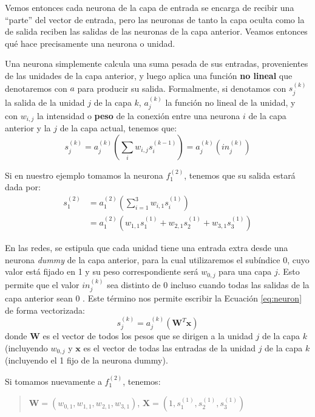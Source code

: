 \documentclass[../../main.tex]{subfiles}
\begin{document}
Vemos entonces cada neurona de la capa de entrada se encarga de recibir una ``parte'' del
vector de entrada, pero las neuronas de tanto la capa oculta como la de salida reciben las
salidas de las neuronas de la capa anterior. Veamos entonces qué hace precisamente una
neurona o unidad.

Una neurona simplemente calcula una suma pesada de sus entradas, provenientes de las
unidades de la capa anterior, y luego aplica una función \textbf{no lineal} que
denotaremos con \(a\) para producir su salida. Formalmente, si denotamos con \(s^{(k)}_j\)
la salida de la unidad \(j\) de la capa \(k\), \(a^{(k)}_j\) la función no lineal de la
unidad, y con \(w_{i,j}\) la intensidad o \textbf{peso} de la conexión entre una neurona
\(i\) de la capa anterior y la \(j\) de la capa actual, tenemos que:
\begin{equation}
    s^{(k)}_j = a^{(k)}_j \left( \sum_i w_{i,j} s^{(k-1)}_i \right) = a^{(k)}_j (in^{(k)}_j)
    \label{eq:neuron}
\end{equation}

Si en nuestro ejemplo tomamos la neurona \(f^{(2)}_1\), tenemos que su salida estará dada
por:
\begin{align*}
    s^{(2)}_1 &= a^{(2)}_1 \left( \sum_{i=1}^{3} w_{i,1} s^{(1)}_i \right) \\
              &= a^{(2)}_1 \left( w_{1,1}s^{(1)}_1 +  w_{2,1}s^{(1)}_2 + w_{3,1}s^{(1)}_3 \right)
\end{align*}

En las redes, se estipula que cada unidad tiene una entrada extra desde una neurona
\textit{dummy} de la capa anterior, para la cual utilizaremos el subíndice 0, cuyo valor
está fijado en 1 y su peso correspondiente será \(w_{0,j}\) para una capa \(j\). Esto
permite que el valor \(in^{(k)}_j\) sea distinto de 0 incluso cuando todas las salidas de
la capa anterior sean 0 \cite{ai-a-modern-approach}. Este término nos permite escribir la
Ecuación \ref{eq:neuron} de forma vectorizada:
\begin{equation}
    s^{(k)}_j = a^{(k)}_j \left( \mathbf{W}^T \mathbf{x} \right)
\end{equation}
donde \(\mathbf{W}\) es el vector de todos los pesos que se dirigen a la unidad \(j\) de
la capa \(k\) (incluyendo \(w_{0,j}\) y \(\mathbf{x}\) es el vector de todas las entradas
de la unidad \(j\) de la capa \(k\) (incluyendo el 1 fijo de la neurona dummy).

Si tomamos nuevamente a \(f^{(2)}_1\), tenemos:
\begin{quote}
    \(\mathbf{W} = (w_{0,1}, w_{1,1}, w_{2,1}, w_{3,1})\),
    \(\mathbf{X} = (1, s^{(1)}_1, s^{(1)}_2, s^{(1)}_3)\)
\end{quote}
\end{document}
